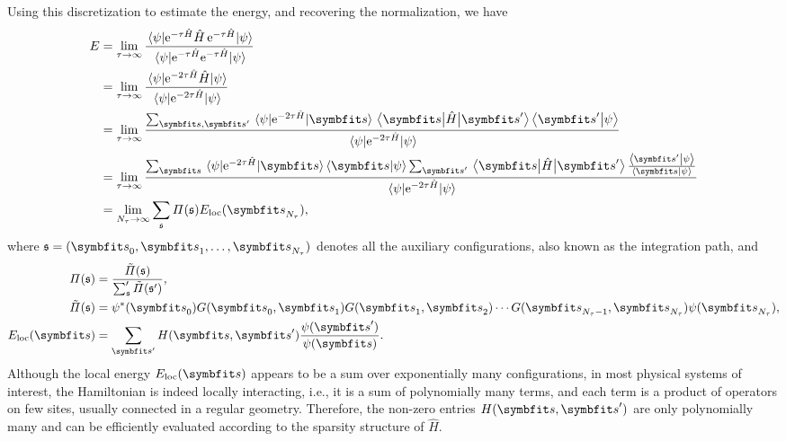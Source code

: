 Using this discretization to estimate the energy, and recovering the normalization, we have
\begin{align}
E &= \lim_{\tau \to \infty} \frac{\ev{\rme^{-\tau \hat{H}} \hat{H}\,\rme^{-\tau \hat{H}}}{\psiinit}}{\ev{\rme^{-\tau \hat{H}} \rme^{-\tau \hat{H}}}{\psiinit}} \\
&= \lim_{\tau \to \infty} \frac
{\ev{\rme^{-2 \tau \hat{H}} \hat{H}}{\psiinit}}
{\ev{\rme^{-2 \tau \hat{H}}}{\psiinit}} \label{eq:pimc-commute} \\
&= \lim_{\tau \to \infty} \frac
{\sum_{\vs, \vs'} \mel{\psiinit}{\rme^{-2 \tau \hat{H}}}{\vs} \mel{\vs}{\hat{H}}{\vs'} \ip{\vs'}{\psiinit}}
{\ev{\rme^{-2 \tau \hat{H}}}{\psiinit}} \\
&= \lim_{\tau \to \infty} \frac
{\sum_\vs \mel{\psiinit}{\rme^{-2 \tau \hat{H}}}{\vs} \ip{\vs}{\psiinit} \sum_{\vs'} \mel{\vs}{\hat{H}}{\vs'} \frac{\ip{\vs'}{\psiinit}}{\ip{\vs}{\psiinit}}}
{\ev{\rme^{-2 \tau \hat{H}}}{\psiinit}} \\
&= \lim_{N_\tau \to \infty} \sum_\svs \varPi(\svs) E_\text{loc}(\vs_{N_\tau}), \label{eq:pimc}
\end{align}
where $\svs = (\vs_0, \vs_1, \ldots, \vs_{N_\tau})$ denotes all the auxiliary configurations, also known as the integration path, and
\begin{align}
\varPi(\svs) &= \frac{\tilde{\varPi}(\svs)}{\sum_\svs' \tilde{\varPi}(\svs')}, \\
\tilde{\varPi}(\svs) &= \psiinit^*(\vs_0) G(\vs_0, \vs_1) G(\vs_1, \vs_2) \cdots G(\vs_{N_\tau - 1}, \vs_{N_\tau}) \psiinit(\vs_{N_\tau}), \label{eq:pimc-pi} \\
E_\text{loc}(\vs) &= \sum_{\vs'} H(\vs, \vs') \frac{\psiinit(\vs')}{\psiinit(\vs)}.
\end{align}
Although the local energy $E_\text{loc}(\vs)$ appears to be a sum over exponentially many configurations, in most physical systems of interest, the Hamiltonian is indeed locally interacting, i.e., it is a sum of polynomially many terms, and each term is a product of operators on few sites, usually connected in a regular geometry. Therefore, the non-zero entries $H(\vs, \vs')$ are only polynomially many and can be efficiently evaluated according to the sparsity structure of $\hat{H}$.

